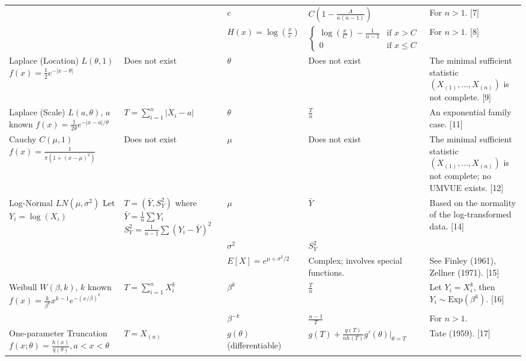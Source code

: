 \documentclass[11pt, letterpaper]{article}
\begin{document}
\begin{longtable}{>{\raggedright}p{3.5cm} >{\raggedright}p{4cm} >{\centering}p{2cm} >{\raggedright}p{4cm} >{\raggedright\arraybackslash}p{2cm}}
& & $c$ & $C(1 - \frac{A}{n(n-1)})$ & For $n>1$. [7] \\
& & $H(x) = \log(\frac{x}{c})$ & $\begin{cases} \log(\frac{x}{C}) - \frac{1}{n-1} & \text{if } x > C \\ 0 & \text{if } x \le C \end{cases}$ & For $n>1$. [8] \\
\midrule
Laplace (Location) $L(\theta,1)$ \newline $f(x) = \frac{1}{2} e^{-|x-\theta|}$ & Does not exist & $\theta$ & Does not exist & The minimal sufficient statistic $(X_{(1)}, \dots, X_{(n)})$ is not complete. [9] \\
\midrule
Laplace (Scale) $L(a,\theta)$, $a$ known \newline $f(x) = \frac{1}{2\theta} e^{-|x-a|/\theta}$ & $T = \sum_{i=1}^n |X_i - a|$ & $\theta$ & $\frac{T}{n}$ & An exponential family case. [11] \\
\midrule
Cauchy $C(\mu,1)$ \newline $f(x) = \frac{1}{\pi(1+(x-\mu)^2)}$ & Does not exist & $\mu$ & Does not exist & The minimal sufficient statistic $(X_{(1)}, \dots, X_{(n)})$ is not complete; no UMVUE exists. [12] \\
\midrule
Log-Normal $LN(\mu, \sigma^2)$ \newline Let $Y_i = \log(X_i)$ & $T=(\bar{Y}, S_Y^2)$ where \newline $\bar{Y} = \frac{1}{n} \sum Y_i$ \newline $S_Y^2 = \frac{1}{n-1} \sum(Y_i - \bar{Y})^2$ & $\mu$ & $\bar{Y}$ & Based on the normality of the log-transformed data. [14] \\
& & $\sigma^2$ & $S_Y^2$ & [14] \\
& & $E[X] = e^{\mu+\sigma^2/2}$ & Complex; involves special functions. & See Finley (1961), Zellner (1971). [15] \\
\midrule
Weibull $W(\beta, k)$, $k$ known \newline $f(x) = \frac{k}{\beta^k} x^{k-1} e^{-(x/\beta)^k}$ & $T = \sum_{i=1}^n X_i^k$ & $\beta^k$ & $\frac{T}{n}$ & Let $Y_i = X_i^k$, then $Y_i \sim \text{Exp}(\beta^k)$. [16] \\
& & $\beta^{-k}$ & $\frac{n-1}{T}$ & For $n>1$. \\
\midrule
One-parameter Truncation \newline $f(x;\theta) = \frac{h(x)}{q(\theta)}, a < x < \theta$ & $T=X_{(n)}$ & $g(\theta)$ (differentiable) & $g(T) + \frac{q(T)}{n h(T)} g'(\theta) \big|_{\theta=T}$ & Tate (1959). [17] \\
\end{longtable}
\end{document}
